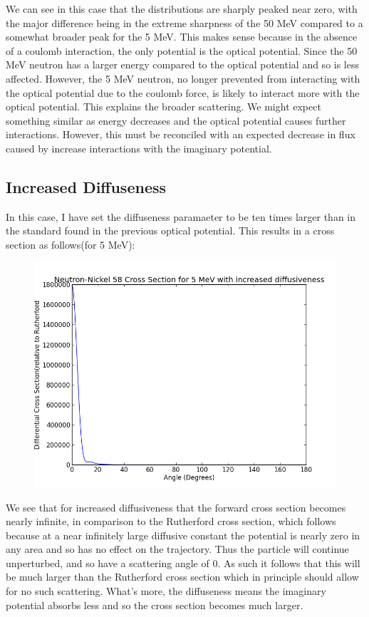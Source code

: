 \documentclass[paper=a4, fontsize=11pt]{scrartcl} %
\numberwithin{equation}{section} %
\numberwithin{figure}{section} %
\numberwithin{table}{section} %
\begin{document}
We can see in this case that the distributions are sharply peaked near zero, with the major difference being in the extreme sharpness of the 50 MeV compared to a somewhat  broader peak for the 5 MeV. This makes sense because in the absence of a coulomb interaction, the only potential is the optical potential. Since the 50 MeV neutron has a larger energy compared to the optical potential and so is less affected. However, the 5 MeV neutron, no longer prevented from interacting with the optical potential due to the coulomb force, is likely to interact more with the optical potential. This explains the broader scattering. We might expect something similar as energy decreases and the optical potential causes further interactions. However, this must be reconciled with an expected decrease in flux caused by increase interactions with the imaginary potential.\\

\subsection{Increased Diffuseness}

In this case, I have set the diffuseness paramaeter to be ten times larger than in the standard found in the previous optical potential. This results in a cross section as follows(for 5 MeV):\\
\begin{figure}[hbt]
\centering
\includegraphics[width=\textwidth]{NeutronDiff.png}
\end{figure}

We see that for increased diffusiveness that the forward cross section becomes nearly infinite, in comparison to the Rutherford cross section, which follows because at a near infinitely large diffusive constant the potential is nearly zero in any area and so has no effect on the trajectory. Thus the particle will continue unperturbed, and so have a scattering angle of 0. As such it follows that this will be much larger than the Rutherford cross section which in principle should allow for no such scattering. What's more, the diffuseness means the imaginary potential absorbs less and so the cross section becomes much larger.\\
\end{document}
